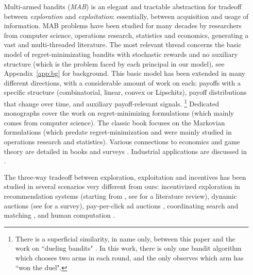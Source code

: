  Multi-armed bandits (\emph{MAB}) is an elegant and tractable abstraction for tradeoff between \emph{exploration} and \emph{exploitation}: essentially, between acquisition and usage of information. MAB problems have been studied for many decades by researchers from computer science, operations research, statistics and economics, generating a vast and multi-threaded literature.  The most relevant thread concerns the basic model of regret-minimizating bandits with stochastic rewards and no auxiliary structure (which is the problem faced by each principal in our model), see Appendix~\ref{app:bg} for background. This basic model has been extended in many different directions, with a considerable amount of work on each: \eg payoffs with a specific structure (\eg combinatorial, linear, convex or Lipschitz), payoff distributions that change over time, and auxiliary payoff-relevant signals.%
\footnote{There is a superficial similarity, in name only, between this paper and the work on ``dueling bandits" \citep[starting from][]{Yue-dueling12,Yue-dueling-icml09}.
In this work, there is only one bandit algorithm which chooses two arms in each round, and the only observes which arm has ``won the duel".}
Dedicated monographs \citep{Bubeck-survey12,slivkins-MABbook,LS19bandit-book} cover the work on regret-minimizing formulations (which mainly comes from computer science). The classic book
\citep{Gittins-book11} focuses on the Markovian formulations (which predate regret-minimization and were mainly studied in operations research and statistics).
Various connections to economics and game theory are detailed in
books \citep{CesaBL-book,slivkins-MABbook} and surveys \citep{Bergemann-survey06,Horner-survey16}. Industrial applications are discussed in \citep{DS-arxiv}.

The three-way tradeoff between exploration, exploitation and incentives has been studied in several scenarios very different from ours:
incentivized exploration in recommendation systems 
(starting from \citet{Kremer-JPE14,Che-13}, see \citet[Ch. 11.6]{slivkins-MABbook} for a literature review),
dynamic auctions
    (\eg see \citet{DynAuctions-survey10} for a survey),
pay-per-click ad auctions
    \citep[\eg][]{MechMAB-ec09,DevanurK09,Transform-ec10-jacm},
coordinating search and matching
    \citep{Bobby-Glen-ec16},
and human computation
    \citep[\eg][]{RepeatedPA-ec14,Ghosh-itcs13,Krause-www13}.

